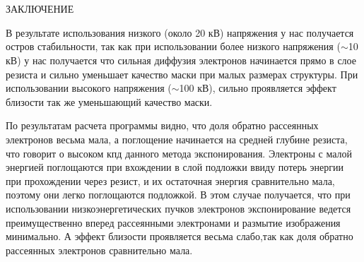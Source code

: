 \chapter*{}
\begin{center}
ЗАКЛЮЧЕНИЕ
\end{center}
В результате использования низкого (около 20 кВ) напряжения у нас получается остров стабильности,
так как при использовании более низкого напряжения (\(\sim\)10 кВ) у нас получается что сильная диффузия электронов начинается прямо в слое резиста и сильно уменьшает качество маски при малых размерах структуры.
При использовании высокого напряжения (\(\sim\)100 кВ), сильно проявляется эффект близости так же уменьшающий качество маски.

По результатам расчета программы видно, что доля обратно рассеянных электронов весьма мала, а поглощение начинается на средней глубине резиста, что говорит о высоком кпд данного метода экспонирования. Электроны с малой энергией поглощаются при вхождении в слой подложки ввиду потерь энергии при прохождении через резист, и их остаточная энергия сравнительно мала, поэтому они легко поглощаются подложкой. В этом случае получается, что при использовании низкоэнергетических пучков электронов экспонирование ведется преимущественно вперед рассеянными электронами и размытие изображения минимально. А эффект близости проявляется весьма слабо,так как доля обратно рассеянных электронов сравнительно мала.

